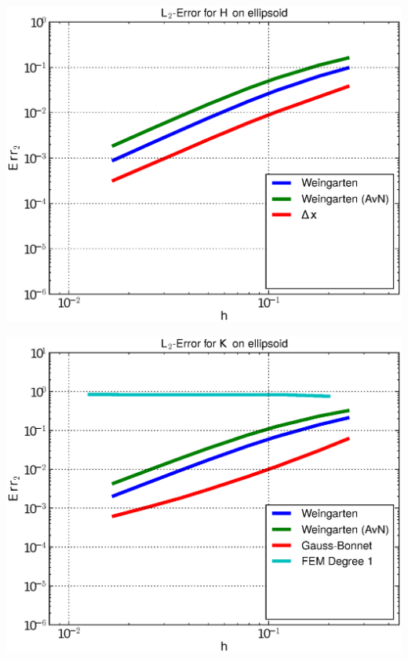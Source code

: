 \documentclass[handout]{beamer}
\begin{document}
\begin{frame}
\begin{overprint}
\begin{minipage}[t]{0.49\textwidth}
            \centering\includegraphics[width=\textwidth]{bilder/Curvature/heineC/ErrHL2_3.eps}
          \end{minipage}
          \begin{minipage}[t]{0.49\textwidth}
            \centering\includegraphics[width=\textwidth]{bilder/Curvature/heineC/ErrKL2_4.eps}
          \end{minipage}\hfill
          \begin{minipage}[t]{0.49\textwidth}

\end{minipage}
\end{overprint}
\end{frame}
\end{document}
